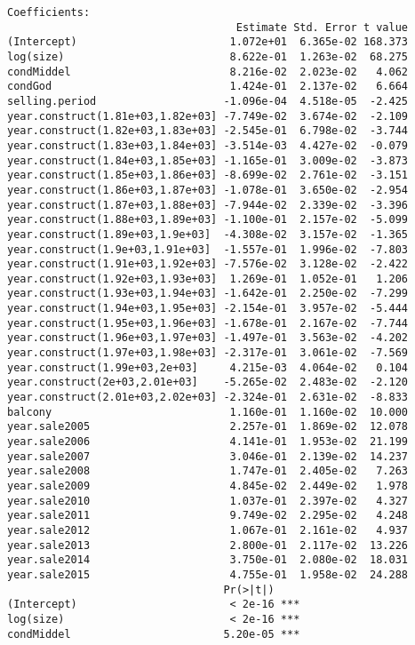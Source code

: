 \begin{lstlisting}
Coefficients:
                                    Estimate Std. Error t value
(Intercept)                        1.072e+01  6.365e-02 168.373
log(size)                          8.622e-01  1.263e-02  68.275
condMiddel                         8.216e-02  2.023e-02   4.062
condGod                            1.424e-01  2.137e-02   6.664
selling.period                    -1.096e-04  4.518e-05  -2.425
year.construct(1.81e+03,1.82e+03] -7.749e-02  3.674e-02  -2.109
year.construct(1.82e+03,1.83e+03] -2.545e-01  6.798e-02  -3.744
year.construct(1.83e+03,1.84e+03] -3.514e-03  4.427e-02  -0.079
year.construct(1.84e+03,1.85e+03] -1.165e-01  3.009e-02  -3.873
year.construct(1.85e+03,1.86e+03] -8.699e-02  2.761e-02  -3.151
year.construct(1.86e+03,1.87e+03] -1.078e-01  3.650e-02  -2.954
year.construct(1.87e+03,1.88e+03] -7.944e-02  2.339e-02  -3.396
year.construct(1.88e+03,1.89e+03] -1.100e-01  2.157e-02  -5.099
year.construct(1.89e+03,1.9e+03]  -4.308e-02  3.157e-02  -1.365
year.construct(1.9e+03,1.91e+03]  -1.557e-01  1.996e-02  -7.803
year.construct(1.91e+03,1.92e+03] -7.576e-02  3.128e-02  -2.422
year.construct(1.92e+03,1.93e+03]  1.269e-01  1.052e-01   1.206
year.construct(1.93e+03,1.94e+03] -1.642e-01  2.250e-02  -7.299
year.construct(1.94e+03,1.95e+03] -2.154e-01  3.957e-02  -5.444
year.construct(1.95e+03,1.96e+03] -1.678e-01  2.167e-02  -7.744
year.construct(1.96e+03,1.97e+03] -1.497e-01  3.563e-02  -4.202
year.construct(1.97e+03,1.98e+03] -2.317e-01  3.061e-02  -7.569
year.construct(1.99e+03,2e+03]     4.215e-03  4.064e-02   0.104
year.construct(2e+03,2.01e+03]    -5.265e-02  2.483e-02  -2.120
year.construct(2.01e+03,2.02e+03] -2.324e-01  2.631e-02  -8.833
balcony                            1.160e-01  1.160e-02  10.000
year.sale2005                      2.257e-01  1.869e-02  12.078
year.sale2006                      4.141e-01  1.953e-02  21.199
year.sale2007                      3.046e-01  2.139e-02  14.237
year.sale2008                      1.747e-01  2.405e-02   7.263
year.sale2009                      4.845e-02  2.449e-02   1.978
year.sale2010                      1.037e-01  2.397e-02   4.327
year.sale2011                      9.749e-02  2.295e-02   4.248
year.sale2012                      1.067e-01  2.161e-02   4.937
year.sale2013                      2.800e-01  2.117e-02  13.226
year.sale2014                      3.750e-01  2.080e-02  18.031
year.sale2015                      4.755e-01  1.958e-02  24.288
                                  Pr(>|t|)    
(Intercept)                        < 2e-16 ***
log(size)                          < 2e-16 ***
condMiddel                        5.20e-05 ***

\end{lstlisting}
